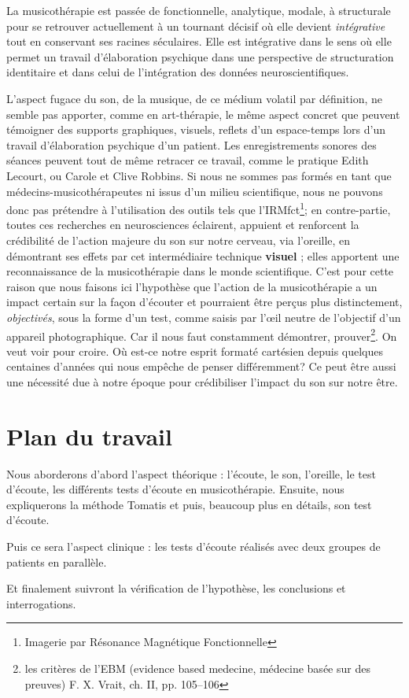  La musicothérapie est passée de fonctionnelle, analytique, mo\-da\-le,  à 
struc\-tu\-rale pour se retrouver actuellement 
 à un tournant décisif où elle devient 
 \emph{intégrative} tout en conservant ses racines séculaires. Elle est 
intégrative dans le sens où elle permet un travail d'élaboration psychique dans 
une perspective de structuration identitaire \autocite[ch. III, p. 53, 
105]{vrait_musicotherapie_2018} et dans celui de l'intégration des données 
neuroscientifiques.
 
  
L'aspect fugace du son, de la musique, de ce médium volatil par
définition, ne semble pas apporter, comme en art-thérapie, le
même aspect concret que peuvent témoigner des supports graphiques,
visuels, reflets d'un espace-temps lors d'un travail d'élaboration
psychique d'un patient. Les enregistrements sonores des séances peuvent tout de 
même retracer ce travail, comme le pratique Edith Lecourt, ou Carole et Clive 
Robbins.
Si nous ne sommes pas formés en tant que médecins-musicothérapeutes ni issus 
d'un milieu scientifique, nous ne pouvons donc  pas prétendre à l'utilisation 
des outils
 tels que l'IRMfct\footnote{Imagerie par Résonance Magnétique Fonctionnelle}; 
en contre-partie, toutes ces recherches en
neurosciences éclairent, appuient et renforcent la crédibilité de l'action
majeure du son sur notre cerveau, via l'oreille, en démontrant ses effets par cet intermédiaire technique \textbf{visuel} ; elles apportent une 
reconnaissance de la musicothérapie dans le monde scientifique. C'est pour 
cette raison que nous  faisons ici l'hypothèse que l'action de la 
musicothérapie a un impact certain sur la façon d'écouter et pourraient être 
perçus plus
distinctement, \textsl{objectivés}, sous la forme d'un test, comme saisis par 
l'\oe il neutre de l'objectif d'un appareil
photographique.
Car il nous faut constamment démontrer, prouver\footnote{
	les critères de l'EBM (evidence based medecine, médecine basée sur des 
preuves) F. X. Vrait, ch. II, pp. 105--106 }. On veut voir pour croire. Où est-ce 
notre esprit formaté cartésien depuis quelques centaines d'années qui nous 
empêche de penser différemment? 
Ce peut être aussi une nécessité due à notre époque pour crédibiliser l'impact 
du son sur notre être. 


\section{Plan du travail}

Nous aborderons d'abord l'aspect théorique : l'écoute, le son, l'oreille, le 
test d'écoute, les différents tests d'écoute en musicothérapie.  Ensuite, nous 
expliquerons  la méthode Tomatis
et puis, beaucoup plus en détails,  son test d'écoute.

Puis ce sera l'aspect clinique : les tests d'écoute réalisés  avec deux groupes 
de patients en parallèle.

Et finalement suivront la vérification de l'hypothèse, les conclusions et 
interrogations. 
